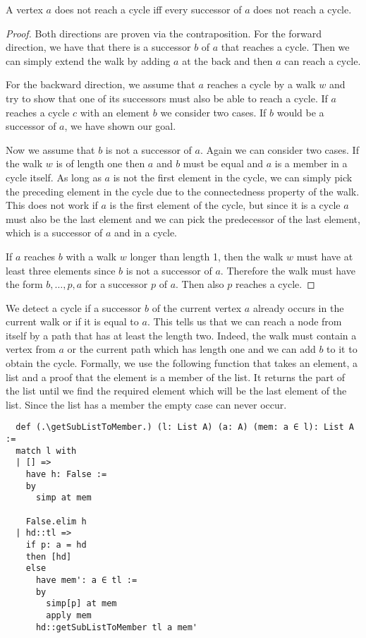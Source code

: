 \begin{lemma}[\NotreachesCycleIffSuccessorsNotReachCycle]
  A vertex $a$ does not reach a cycle iff every successor of $a$ does not reach a cycle.
\end{lemma}
\begin{proof}
  Both directions are proven via the contraposition. For the forward direction, we have that there is a successor $b$ of $a$ that reaches a cycle. Then we can simply extend the walk by adding $a$ at the back and then $a$ can reach a cycle.

  For the backward direction, we assume that $a$ reaches a cycle by a walk $w$ and try to show that one of its successors must also be able to reach a cycle. 
  If $a$ reaches a cycle $c$ with an element $b$ we consider two cases. 
  If $b$ would be a successor of $a$, we have shown our goal.
  
  Now we assume that $b$ is not a successor of $a$. Again we can consider two cases. If the walk $w$ is of length one then $a$ and $b$ must be equal and $a$ is a member in a cycle itself. As long as $a$ is not the first element in the cycle, we can simply pick the preceding element in the cycle due to the connectedness property of the walk. This does not work if $a$ is the first element of the cycle, but since it is a cycle $a$ must also be the last element and we can pick the predecessor of the last element, which is a successor of $a$ and in a cycle.

  If $a$ reaches $b$ with a walk $w$ longer than length 1, then the walk $w$ must have at least three elements since $b$ is not a successor of $a$. Therefore the walk must have the form $b, \dots ,p, a$ for a successor $p$ of $a$. Then also $p$ reaches a cycle.
\end{proof}

We detect a cycle if a successor $b$ of the current vertex $a$ already occurs in the current walk or if it is equal to $a$. This tells us that we can reach a node from itself by a path that has at least the length two. Indeed, the walk must contain a vertex from $a$ or the current path which has length one and we can add $b$ to it to obtain the cycle. Formally, we use the following function that takes an element, a list and a proof that the element is a member of the list. It returns the part of the list until we find the required element which will be the last element of the list. Since the list has a member the empty case can never occur.

\begin{lstlisting}
  def (.\getSubListToMember.) (l: List A) (a: A) (mem: a ∈ l): List A :=
  match l with
  | [] =>
    have h: False :=
    by
      simp at mem

    False.elim h
  | hd::tl =>
    if p: a = hd
    then [hd]
    else
      have mem': a ∈ tl :=
      by
        simp[p] at mem
        apply mem
      hd::getSubListToMember tl a mem'
\end{lstlisting}

